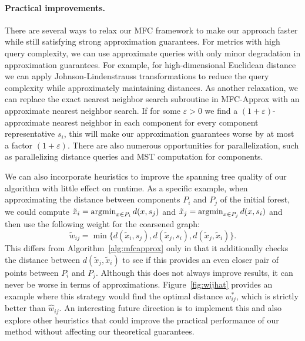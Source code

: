 \paragraph{Practical improvements.} There are several ways to relax our MFC framework to make our approach faster while still satisfying strong approximation guarantees. For metrics with high query complexity, we can use approximate queries with only minor degradation in approximation guarantees. For example, for high-dimensional Euclidean distance we can apply Johnson-Lindenstrauss transformations to reduce the query complexity while approximately maintaining distances. As another relaxation, we can replace the exact nearest neighbor search subroutine in \textsf{MFC-Approx} with an approximate nearest neighbor search. If for some $\varepsilon > 0$ we find a $(1+\varepsilon)$-approximate nearest neighbor in each component for every component representative $s_i$, this will make our approximation guarantees worse by at most a factor $(1+\varepsilon)$. There are also numerous opportunities for parallelization, such as parallelizing distance queries and MST computation for components. 

We can also incorporate heuristics to improve the spanning tree quality of our algorithm with little effect on runtime. As a specific example, when approximating the distance between components $P_i$ and $P_j$ of the initial forest, we could compute $\tilde{x}_i = \operatorname{argmin}_{x \in P_i} d(x,s_j)$ and $\tilde{x}_j = \operatorname{argmin}_{x \in P_j} d(x,s_i)$ and then use the following weight for the coarsened graph:
\begin{equation*}
	\tilde{w}_{ij} = \min \{d(\tilde{x}_i, s_j),d(\tilde{x}_j, s_i), d(\tilde{x}_j,\tilde{x}_i)\}.
\end{equation*}
This differs from Algorithm~\ref{alg:mfcapprox} only in that it additionally checks the distance between $d(\tilde{x}_j,\tilde{x}_i)$ to see if this provides an even closer pair of points between $P_i$ and $P_j$. Although this does not always improve results, it can never be worse in terms of approximations. Figure~\ref{fig:wijhat} provides an example where this strategy would find the optimal distance $w_{ij}^*$, which is strictly better than $\hat{w}_{ij}$. An interesting future direction is to implement this and also explore other heuristics that could improve the practical performance of our method without affecting our theoretical guarantees.
